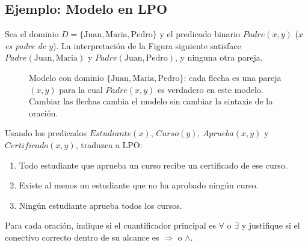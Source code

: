 \subsection{Ejemplo: Modelo en LPO}

\begin{example}
    Sea el dominio $D = \{\text{Juan}, \text{Maria}, \text{Pedro}\}$ y el predicado binario $Padre(x,y)$ (\textit{$x$ es
    padre de $y$}). La interpretación de la Figura siguiente satisface $Padre(\text{Juan},\text{Maria})$ y
    $Padre(\text{Juan},\text{Pedro})$, y ninguna otra pareja.
\end{example}

\begin{figure}[H]
\centering
{}
\caption{Modelo con dominio $\{\text{Juan},\text{Maria},\text{Pedro}\}$: cada flecha es una pareja $(x,y)$ para la
cual $Padre(x,y)$ es verdadero en este modelo. Cambiar las flechas cambia el modelo sin cambiar la sintaxis de la
oración.}
\end{figure}

\begin{exercise}
    Usando los predicados $Estudiante(x)$, $Curso(y)$, $Aprueba(x,y)$ y $Certificado(x,y)$, traduzca a LPO:
    \begin{enumerate}
        \item Todo estudiante que aprueba un curso recibe un certificado de ese curso.
        \item Existe al menos un estudiante que no ha aprobado ningún curso.
        \item Ningún estudiante aprueba todos los cursos.
    \end{enumerate}
    Para cada oración, indique si el cuantificador principal es $\forall$ o $\exists$ y justifique si el conectivo
    correcto dentro de su alcance es $\Rightarrow$ o $\land$.
\end{exercise}
